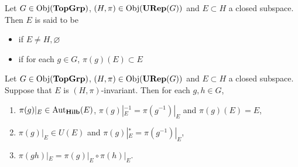 \documentclass{book}
\begin{document}
	\begin{defn}
		Let $G \in \operatorname{Obj}(\operatorname*{\text{\textbf{TopGrp}}})$, $(H, \pi) \in \operatorname{Obj}(\operatorname*{\text{\textbf{URep}}}(G))$ and $E \subset H$ a closed subspace. Then $E$ is said to be 
		\begin{itemize}
			\item {} if $E \neq H, \varnothing$
			\item {} if for each $g \in G$, $\pi(g)(E) \subset E$
		\end{itemize} 
	\end{defn}

	\begin{ex}
		Let $G \in \operatorname{Obj}(\operatorname*{\text{\textbf{TopGrp}}})$, $(H, \pi) \in \operatorname{Obj}(\operatorname*{\text{\textbf{URep}}}(G))$ and $E \subset H$ a closed subspace. Suppose that $E$ is $(H, \pi)$-invariant. Then for each $g,h \in G$, 
		\begin{enumerate}
			\item $\pi(g)|_E \in \operatorname{Aut}_{\operatorname*{\text{\textbf{Hilb}}}}(E)$, $\pi(g)|_E^{-1} = \pi(g^{-1})|_E$ and $\pi(g)(E) = E$,
			\item $\pi(g)|_E \in U(E)$ and $\pi(g)|_E^* = \pi(g^{-1})|_E$, 
			\item $\pi(g h)|_E = \pi(g)|_E \circ \pi(h)|_E$. 
		\end{enumerate}
	\end{ex}
\end{document}
